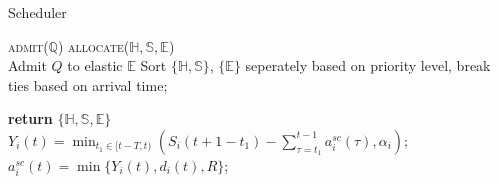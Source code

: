 \begin{algorithm}
	\small
	\caption{\name Scheduler}
	\label{algorithm1}
	\begin{algorithmic}[1]
		\State \textsc{admit}($\mathbb{Q}$)
		\State \textsc{allocate}($\mathbb{H},\mathbb{S}, \mathbb{E}$)
		\EndProcedure
		\\
		\Else
		\State Admit $Q$ to elastic $\mathbb{E}$
		\EndIf
		\EndFor
		\State Sort $\{\mathbb{H},\mathbb{S}\}$, $\{\mathbb{E}\}$ seperately based on priority level, break ties based on arrival time;
		
		\State \textbf{return} $\{\mathbb{H},\mathbb{S},\mathbb{E}\}$	
		\EndFunction
		\\
		\State   $Y_i (t) = \min_{t_1 \in [t-T,t)} (S_i(t+1-t_1)-\sum_{\tau=t_1}^{t-1}a^{sc}_i(\tau), \alpha_i);$ 
		\State   $a^{sc}_i(t) = \min\{Y_i(t), d_i(t),R\}$;
		\EndFor
		\EndIf
		\EndIf
		\EndFunction
	\end{algorithmic}
\end{algorithm}






%
%
%
%


%